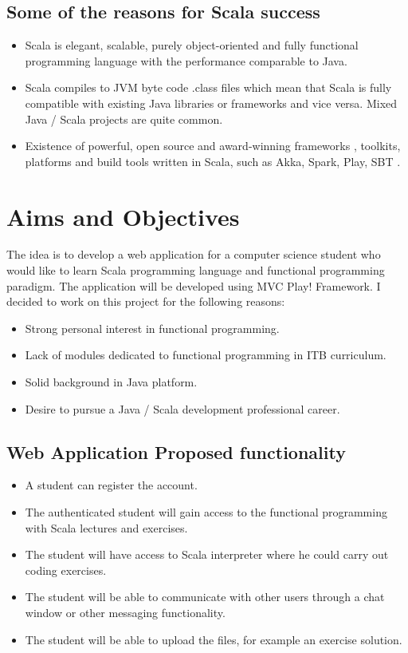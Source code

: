 \documentclass[12pt,twoside,a4paper]{report}
\begin{document}
\subsection{Some of the reasons for Scala success}\label{1.1.1}
\begin{itemize}\itemsep1pt \parskip0pt 
\item Scala is elegant, scalable, purely object-oriented and fully functional programming language with the performance comparable to Java.
\item Scala compiles to JVM byte code .class files which mean that Scala is fully compatible with existing Java libraries or frameworks and vice versa. Mixed Java / Scala projects are quite common.
\item Existence of powerful, open source and award-winning frameworks \cite{6}, toolkits, platforms and build tools written in Scala, such as Akka, Spark, Play, SBT \cite{7}.
\end{itemize}
\section{Aims and Objectives}\label{1.2}
The idea is to develop a web application for a computer science student who would like to learn Scala programming language and functional programming paradigm. The application will be developed using MVC Play! Framework. I decided to work on this project for the following reasons:
\begin{itemize}\itemsep1pt \parskip0pt 
\item Strong personal interest in functional programming.
\item Lack of modules dedicated to functional programming in ITB curriculum.
\item Solid background in Java platform.
\item Desire to pursue a Java / Scala development professional career.
\end{itemize}
\subsection{Web Application Proposed functionality}\label{1.2.1}
\begin{itemize}\itemsep1pt \parskip0pt 
\item A student can register the account.
\item The authenticated student will gain access to the functional programming with Scala lectures and exercises.
\item The student will have access to Scala interpreter where he could carry out coding exercises.
\item The student will be able to communicate with other users through a chat window or other messaging functionality.
\item The student will be able to upload the files, for example an exercise solution.
\end{itemize}
\end{document}
